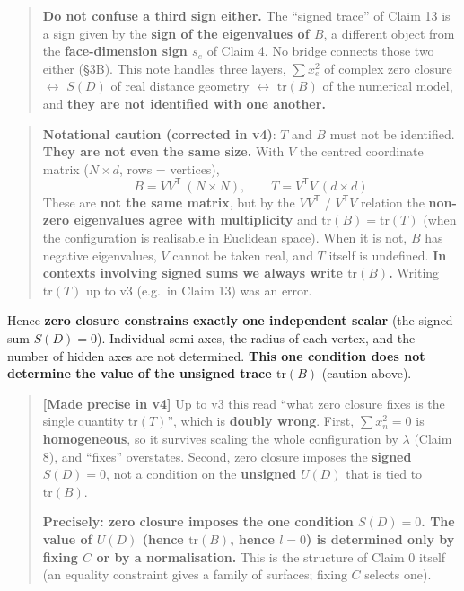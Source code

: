 \documentclass[
  10pt,
]{article}
\begin{document}
\begin{quote}
\textbf{Do not confuse a third sign either.} The ``signed trace'' of
Claim 13 is a sign given by the \textbf{sign of the eigenvalues of
\(B\)}, a different object from the \textbf{face-dimension sign \(s_e\)}
of Claim 4. No bridge connects those two either (§3B). This note handles
three layers, \(\sum x_e^2\) of complex zero closure \(\leftrightarrow\)
\(S(D)\) of real distance geometry \(\leftrightarrow\)
\(\mathrm{tr}(B)\) of the numerical model, and \textbf{they are not
identified with one another.}
\end{quote}

\begin{quote}
\textbf{Notational caution (corrected in v4)}: \(T\) and \(B\) must not
be identified. \textbf{They are not even the same size.} With \(V\) the
centred coordinate matrix (\(N\times d\), rows = vertices),
\[B = VV^{\mathsf T}\ (N\times N), \qquad T = V^{\mathsf T}V\ (d\times d)\]
These are \textbf{not the same matrix}, but by the \(VV^{\mathsf T}\) /
\(V^{\mathsf T}V\) relation the \textbf{non-zero eigenvalues agree with
multiplicity} and \textbf{\(\mathrm{tr}(B) = \mathrm{tr}(T)\)} (when the
configuration is realisable in Euclidean space). When it is not, \(B\)
has negative eigenvalues, \(V\) cannot be taken real, and \(T\) itself
is undefined. \textbf{In contexts involving signed sums we always write
\(\mathrm{tr}(B)\).} Writing \(\mathrm{tr}(T)\) up to v3 (e.g.~in Claim
13) was an error.
\end{quote}

Hence \textbf{zero closure constrains exactly one independent scalar}
(the signed sum \(S(D)=0\)). Individual semi-axes, the radius of each
vertex, and the number of hidden axes are not determined. \textbf{This
one condition does not determine the value of the unsigned trace
\(\mathrm{tr}(B)\)} (caution above).

\begin{quote}
\textbf{{[}Made precise in v4{]}} Up to v3 this read ``what zero closure
fixes is the single quantity \(\mathrm{tr}(T)\)'', which is
\textbf{doubly wrong}. First, \(\sum x_n^2 = 0\) is
\textbf{homogeneous}, so it survives scaling the whole configuration by
\(\lambda\) (Claim 8), and ``fixes'' overstates. Second, zero closure
imposes the \textbf{signed} \(S(D)=0\), not a condition on the
\textbf{unsigned} \(U(D)\) that is tied to \(\mathrm{tr}(B)\).

\textbf{Precisely: zero closure imposes the one condition \(S(D)=0\).
The value of \(U(D)\) (hence \(\mathrm{tr}(B)\), hence \(l=0\)) is
determined only by fixing \(C\) or by a normalisation.} This is the
structure of Claim 0 itself (an equality constraint gives a family of
surfaces; fixing \(C\) selects one).
\end{quote}
\end{document}
